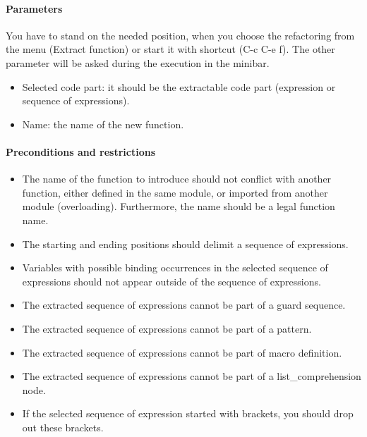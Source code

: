 \documentclass[12pt]{article}
\begin{document}
\paragraph{Parameters}
You have to stand on the needed position, when you choose the refactoring from the menu (Extract function) or start it with shortcut (C-c C-e f).
The other parameter will be asked during the execution in the minibar.
\begin{itemize}
	\item Selected code part: it should be the extractable code part (expression or sequence of expressions).
	\item Name: the name of the new function.
\end{itemize}
\paragraph{Preconditions and restrictions}
\begin{itemize}
	\item The name of the function to introduce should not conflict with another
      function, either defined in the same module, or imported from another
      module (overloading). Furthermore, the name should be a legal function name.

	\item The starting and ending positions should delimit a sequence of
      expressions. 

	\item Variables with possible binding occurrences in the selected 
      sequence of expressions should not appear outside of the 
      sequence of expressions.

	\item The extracted sequence of expressions cannot be part of a guard sequence.

	\item The extracted sequence of expressions cannot be part of a pattern.

	\item The extracted sequence of expressions cannot be part of macro definition.

	\item The extracted sequence of expressions cannot be part of a
      \newline list\_comprehension node. 

	\item If the selected sequence of expression started with brackets, you should 
      drop out these brackets.
      \end{itemize}
      
\end{document}

